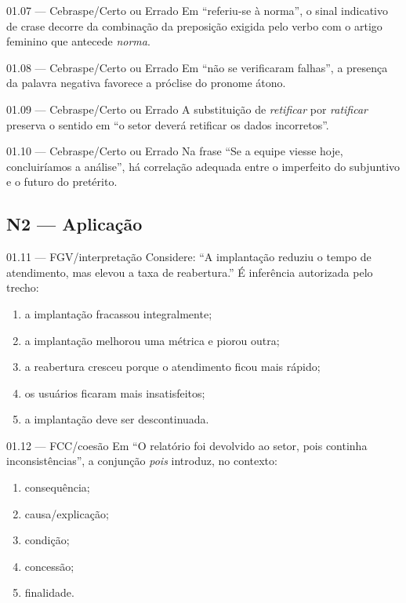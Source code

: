 \begin{questao}{ 01.07 — Cebraspe/Certo ou Errado}
Em ``referiu-se à norma'', o sinal indicativo de crase decorre da combinação da preposição exigida pelo verbo com o artigo feminino que antecede \emph{norma}.
\end{questao}

\begin{questao}{ 01.08 — Cebraspe/Certo ou Errado}
Em ``não se verificaram falhas'', a presença da palavra negativa favorece a próclise do pronome átono.
\end{questao}

\begin{questao}{ 01.09 — Cebraspe/Certo ou Errado}
A substituição de \emph{retificar} por \emph{ratificar} preserva o sentido em ``o setor deverá retificar os dados incorretos''.
\end{questao}

\begin{questao}{ 01.10 — Cebraspe/Certo ou Errado}
Na frase ``Se a equipe viesse hoje, concluiríamos a análise'', há correlação adequada entre o imperfeito do subjuntivo e o futuro do pretérito.
\end{questao}

\subsection*{N2 — Aplicação}

\begin{questao}{ 01.11 — FGV/interpretação}
Considere: ``A implantação reduziu o tempo de atendimento, mas elevou a taxa de reabertura.'' É inferência autorizada pelo trecho:
\begin{enumerate}[label=\Alph*)]
\item a implantação fracassou integralmente;
\item a implantação melhorou uma métrica e piorou outra;
\item a reabertura cresceu porque o atendimento ficou mais rápido;
\item os usuários ficaram mais insatisfeitos;
\item a implantação deve ser descontinuada.
\end{enumerate}
\end{questao}

\begin{questao}{ 01.12 — FCC/coesão}
Em ``O relatório foi devolvido ao setor, pois continha inconsistências'', a conjunção \emph{pois} introduz, no contexto:
\begin{enumerate}[label=\Alph*)]
\item consequência;
\item causa/explicação;
\item condição;
\item concessão;
\item finalidade.
\end{enumerate}
\end{questao}

